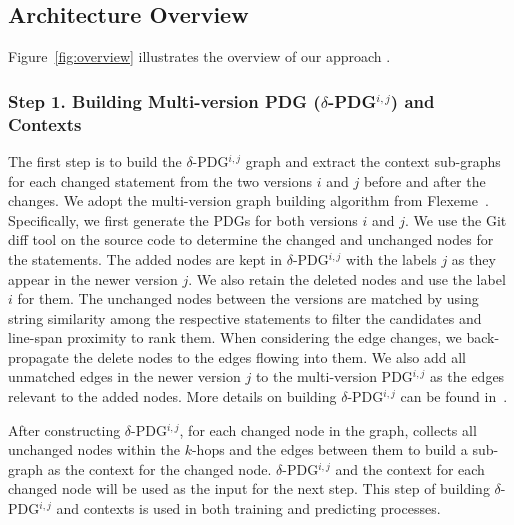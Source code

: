 \subsection{Architecture Overview}


Figure~\ref{fig:overview} illustrates the overview of our approach {\tool}.

\subsubsection{{\bf Step 1. Building Multi-version PDG ($\delta$-PDG$^{i,j}$) and Contexts}}
The first step is to build the $\delta$-PDG$^{i,j}$ graph and extract
the context sub-graphs for each changed statement from the two
versions $i$ and $j$ before and after the changes. We adopt the
multi-version graph building algorithm from
Flexeme~\cite{flexeme-fse20}. Specifically, we first generate the PDGs
for both versions $i$ and $j$. We use the Git diff tool on the source
code to determine the changed and unchanged nodes for the
statements. The added nodes are kept in $\delta$-PDG$^{i,j}$ with the
labels $j$ as they appear in the newer version $j$. We also retain the
deleted nodes and use the label $i$ for them. The unchanged nodes
between the versions are matched by using string similarity among the
respective statements to filter the candidates and line-span proximity
to rank them. When considering the edge changes, we back-propagate the
delete nodes to the edges flowing into them. We also add all unmatched
edges in the newer version $j$ to the multi-version PDG$^{i,j}$ as the
edges relevant to the added nodes. More details on building
$\delta$-PDG$^{i,j}$ can be found in~\cite{flexeme-fse20}.

After constructing $\delta$-PDG$^{i,j}$, for each changed node in the
graph, \tool collects all unchanged nodes within the $k$-hops and the
edges between them to build a sub-graph as the context for the changed
node. $\delta$-PDG$^{i,j}$ and the context for each changed node will
be used as the input for the next step. This step of building
$\delta$-PDG$^{i,j}$ and contexts is used in both training and
predicting processes.

